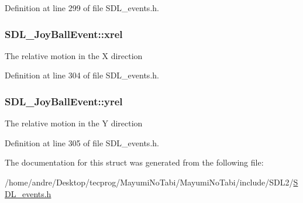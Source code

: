 Definition at line 299 of file S\-D\-L\-\_\-events.\-h.

\hypertarget{struct_s_d_l___joy_ball_event_a959a8473aa1964e5e1778c27a9ffd261}{
\subsubsection[{xrel}]{ S\-D\-L\-\_\-\-Joy\-Ball\-Event\-::xrel}}\label{struct_s_d_l___joy_ball_event_a959a8473aa1964e5e1778c27a9ffd261}
The relative motion in the X direction 

Definition at line 304 of file S\-D\-L\-\_\-events.\-h.

\hypertarget{struct_s_d_l___joy_ball_event_a28ad48a9eb7a5d3ff62ccba09fcead76}{
\subsubsection[{yrel}]{ S\-D\-L\-\_\-\-Joy\-Ball\-Event\-::yrel}}\label{struct_s_d_l___joy_ball_event_a28ad48a9eb7a5d3ff62ccba09fcead76}
The relative motion in the Y direction 

Definition at line 305 of file S\-D\-L\-\_\-events.\-h.



The documentation for this struct was generated from the following file\-:\begin{DoxyCompactItemize}
\item 
/home/andre/\-Desktop/tecprog/\-Mayumi\-No\-Tabi/\-Mayumi\-No\-Tabi/include/\-S\-D\-L2/\hyperlink{_s_d_l__events_8h}{S\-D\-L\-\_\-events.\-h}\end{DoxyCompactItemize}
